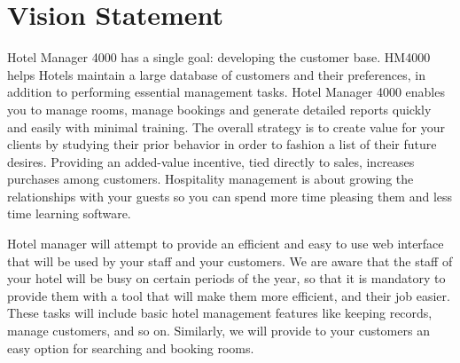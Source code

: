 \section{Vision Statement}
Hotel Manager 4000 has a single goal: developing the customer base. HM4000 helps Hotels maintain a large database of customers and their preferences, in addition to performing essential management tasks. Hotel Manager 4000 enables you to manage rooms, manage bookings and generate detailed reports quickly and easily with minimal training. The overall strategy is to create value for your clients by studying their prior behavior in order to fashion a list of their future desires. Providing an added-value incentive, tied directly to sales, increases purchases among customers. Hospitality management is about growing the relationships with your guests so you can spend more time pleasing them and less time learning software.

Hotel manager will attempt to provide an efficient and easy to use web interface that will be used by your staff and your customers.  We are aware that the staff of your hotel will be busy on certain periods of the year, so that it is mandatory to provide them with a tool that will make them more efficient, and their job easier. These tasks will include basic hotel management features like keeping records, manage customers, and so on.  Similarly, we will provide to your customers an easy option for searching and booking rooms.